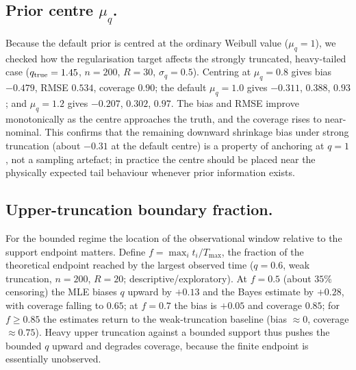 \documentclass[ASNA,twocolumn]{USG}
\begin{document}
\subsection{Prior centre $\mu_q$.}\label{sec:priorcenter}
Because the default prior is centred at the ordinary Weibull value
($\mu_q=1$), we checked how the regularisation target affects the strongly
truncated, heavy-tailed case ($q_{\rm true}=1.45$, $n=200$, $R=30$,
$\sigma_q=0.5$). Centring at $\mu_q=0.8$ gives bias $-0.479$, RMSE
$0.534$, coverage $0.90$; the default $\mu_q=1.0$ gives $-0.311$, $0.388$,
$0.93$; and $\mu_q=1.2$ gives $-0.207$, $0.302$, $0.97$. The bias and RMSE
improve monotonically as the centre approaches the truth, and the
coverage rises to near-nominal. This confirms that the remaining downward
shrinkage bias under strong truncation (about $-0.31$ at the default
centre) is a property of anchoring at $q=1$, not a sampling artefact; in
practice the centre should be placed near the physically expected tail
behaviour whenever prior information exists.

\subsection{Upper-truncation boundary fraction.}\label{sec:boundf}
For the bounded regime the location of the observational window relative
to the support endpoint matters. Define $f=\max_i t_i/T_{\max}$, the
fraction of the theoretical endpoint reached by the largest observed time
($q=0.6$, weak truncation, $n=200$, $R=20$; descriptive/exploratory). At
$f=0.5$ (about $35\%$
censoring) the MLE biases $q$ upward by $+0.13$ and the Bayes estimate by
$+0.28$, with coverage falling to $0.65$; at $f=0.7$ the bias is $+0.05$
and coverage $0.85$; for $f\ge0.85$ the estimates return to the
weak-truncation baseline (bias $\approx0$, coverage $\approx0.75$). Heavy
upper truncation against a bounded support thus pushes the bounded $q$
upward and degrades coverage, because the finite endpoint is essentially
unobserved.
\end{document}
